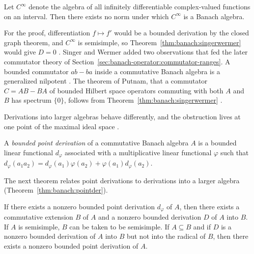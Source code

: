 \begin{corollary}\label{cor:banach:cinfty}
Let $C^\infty$ denote the algebra of all infinitely differentiable
complex-valued functions on an interval. Then there exists no norm under
which $C^\infty$ is a Banach algebra.
\end{corollary}

For the proof, differentiation $f\mapsto f'$ would be a bounded derivation
by the closed graph theorem, and $C^\infty$ is semisimple, so
Theorem~\ref{thm:banach:singerwermer} would give $D=0$
\cite[p.~262]{SingerWermer1955}. Singer and Wermer added two observations
that fed the later commutator theory of
Section~\ref{sec:banach-operator:commutator-ranges}. A bounded commutator
$ab-ba$ inside a commutative Banach algebra is a generalized nilpotent
\cite[p.~261]{SingerWermer1955}. The theorem of Putnam, that a commutator
$C=AB-BA$ of bounded Hilbert space operators commuting with both $A$ and
$B$ has spectrum $\{0\}$, follows from Theorem~\ref{thm:banach:singerwermer}
\cite[p.~264]{SingerWermer1955}.

Derivations into larger algebras behave differently, and the obstruction
lives at one point of the maximal ideal space
\cite[p.~262]{SingerWermer1955}.

\begin{definition}\label{def:banach:pointderivation}
A \emph{bounded point derivation} of a commutative Banach algebra $A$ is a
bounded linear functional $d_\varphi$ associated with a multiplicative
linear functional $\varphi$ such that
$d_\varphi(a_1a_2)=d_\varphi(a_1)\varphi(a_2)+\varphi(a_1)d_\varphi(a_2)$.
\end{definition}

The next theorem relates point derivations to derivations into a larger algebra (Theorem~\ref{thm:banach:pointder}).

\begin{theorem}\label{thm:banach:pointder}
If there exists a nonzero bounded point derivation $d_\varphi$ of $A$, then
there exists a commutative extension $B$ of $A$ and a nonzero bounded
derivation $D$ of $A$ into $B$. If $A$ is semisimple, $B$ can be taken to
be semisimple. If $A\subseteq B$ and if $D$ is a nonzero bounded derivation
of $A$ into $B$ but not into the radical of $B$, then there exists a
nonzero bounded point derivation of $A$.
\end{theorem}

